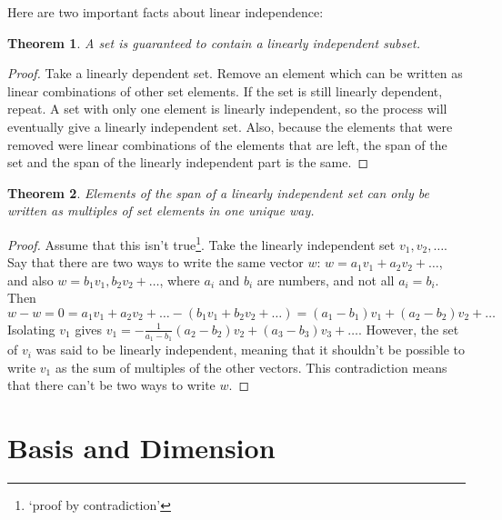 \documentclass{article}
\newtheorem*{theorem}{Theorem}
\begin{document}
       Here are two important facts about linear independence:
       \begin{theorem}
           A set is guaranteed to contain a linearly independent subset.
       \end{theorem}
       \begin{proof}
           Take a linearly dependent set. Remove an element which can be written as linear combinations of other set elements. If the set is still linearly dependent, repeat. A set with only one element is linearly independent, so the process will eventually give a linearly independent set. Also, because the elements that were removed were linear combinations of the elements that are left, the span of the set and the span of the linearly independent part is the same.
       \end{proof}
       \begin{theorem}
       Elements of the span of a linearly independent set can only be written as multiples of set elements in one unique way.
       \end{theorem}
       \begin{proof}
           Assume that this isn't true\footnote{`proof by contradiction'}. Take the linearly independent set ${v_1, v_2, \dots}$. Say that there are two ways to write the same vector $w$: $w = a_1v_1 +a_2v_2 + \dots$, and also $w = b_1v_1, b_2v_2 + \dots$, where $a_i$ and $b_i$ are numbers, and not all $a_i = b_i$. Then $w - w = 0 = a_1 v_1 + a_2v_2 + \dots - (b_1 v_1 + b_2v_2 +\dots ) = (a_1 - b_1)v_1 + (a_2 - b_2)v_2 + \dots$ Isolating $v_1$ gives $v_1 = -\frac {1}{a_1 - b_1} (a_2 - b_2)v_2 + (a_3 - b_3)v_3 + \dots$. However, the set of $v_i$ was said to be linearly independent, meaning that it shouldn't be possible to write $v_1$ as the sum of multiples of the other vectors. This contradiction means that there can't be two ways to write $w$. 
       \end{proof}
   \section{Basis and Dimension}
\end{document}
